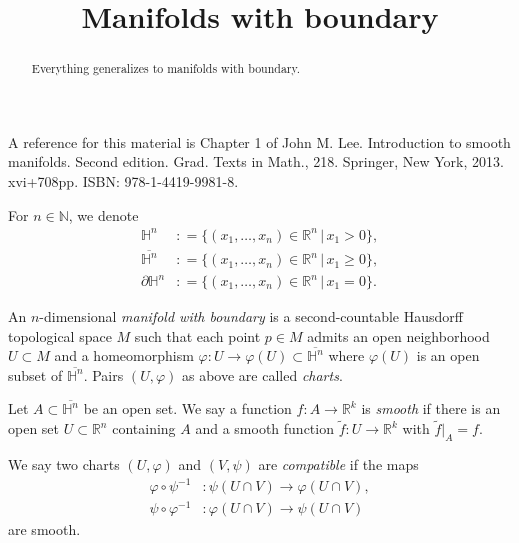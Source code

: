 \documentclass{ximera}
\title{Manifolds with boundary}
\begin{document}
    \begin{abstract} Everything generalizes to manifolds with boundary. \end{abstract}
    \maketitle


    A reference for this material is Chapter 1 of John M. Lee. Introduction to smooth manifolds. Second edition. Grad. Texts in Math., 218. Springer, New York, 2013. xvi+708pp. ISBN: 978-1-4419-9981-8.

    \begin{notation}
        For  $n \in \mathbb{N}$, we denote 
        \begin{align*}
            \mathbb{H}^n & : = \{ (x_1, \ldots , x_n ) \in \mathbb{R}^n \, \vert \, x_1 > 0  \} , \\
            \overline{\mathbb{H}^n} &: = \{ (x_1, \ldots , x_n ) \in \mathbb{R}^n \, \vert \, x_1 \geq 0  \} ,\\
            \partial \mathbb{H}^n & : = \{ (x_1, \ldots , x_n ) \in \mathbb{R}^n \, \vert \, x_1 =  0  \} .
        \end{align*}
         
    \end{notation}

    \begin{definition}
        An $n$-dimensional \emph{manifold with boundary} is a second-countable Hausdorff topological space $M$ such that each point $p\in M$ admits an open neighborhood $U \subset M$ and a homeomorphism $\varphi : U \to \varphi (U ) \subset \overline{ \mathbb{H}^n}$ where $\varphi (U) $ is an open subset of $\overline{ \mathbb{H}^n}$.     Pairs $(U, \varphi)$ as above are called \emph{charts}.
    \end{definition}


    \begin{definition}
    Let $A \subset \overline{\mathbb{H}^n}$ be an open set. We say a function $f : A \to \mathbb{R}^k$ is \emph{smooth} if there is an open set $U \subset \mathbb{R}^n$ containing $A$ and a smooth function $\tilde{f} : U \to \mathbb{R}^k$ with $\tilde{f} \vert _A = f$. 
    \end{definition}


    \begin{definition}
        We say two charts $(U, \varphi )$ and $(V, \psi)$ are \emph{compatible} if the maps
        \begin{align*}
             \varphi \circ \psi ^{-1} &: \psi (U \cap V) \to \varphi (U \cap V)               , \\
             \psi \circ \varphi ^{-1} &: \varphi (U \cap V ) \to \psi (U \cap V)
        \end{align*}
        are smooth. 
    \end{definition}
\end{document}
